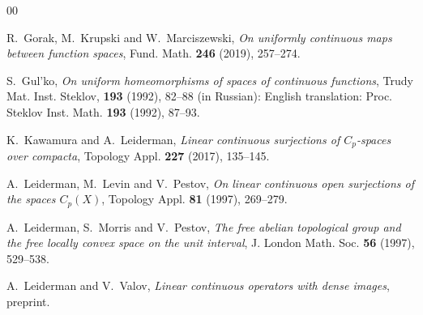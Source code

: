 \documentclass[12pt]{amsart}
\begin{document}
\begin{thebibliography}{00}

R.~Gorak, M.~Krupski and W.~Marciszewski, \textit{On uniformly continuous maps between function spaces}, Fund. Math. \textbf{246} (2019), 257--274. 

S.~Gul'ko, \textit{On uniform homeomorphisms of spaces of continuous functions}, Trudy Mat. Inst. Steklov, \textbf{193} (1992), 82--88 (in Russian):
 English translation: Proc. Steklov Inst. Math. \textbf{193} (1992), 87--93. 




K.~Kawamura and A.~Leiderman, \textit{Linear continuous surjections of $C_p$-spaces over compacta},
 Topology Appl. \textbf{227} (2017), 135--145. 


 
A.~Leiderman, M.~Levin and V.~Pestov, \textit{On linear continuous open surjections of the spaces $C_p(X)$},
 Topology Appl. \textbf{81} (1997), 269--279.

A.~Leiderman, S.~Morris and V.~Pestov, \textit{The free abelian topological group and the free locally convex space on the unit interval},
 J. London Math. Soc. \textbf{56} (1997), 529--538.
 
A.~Leiderman and V.~Valov, \textit{Linear continuous operators with dense images}, preprint. 

	

\end{thebibliography}
\end{document}
